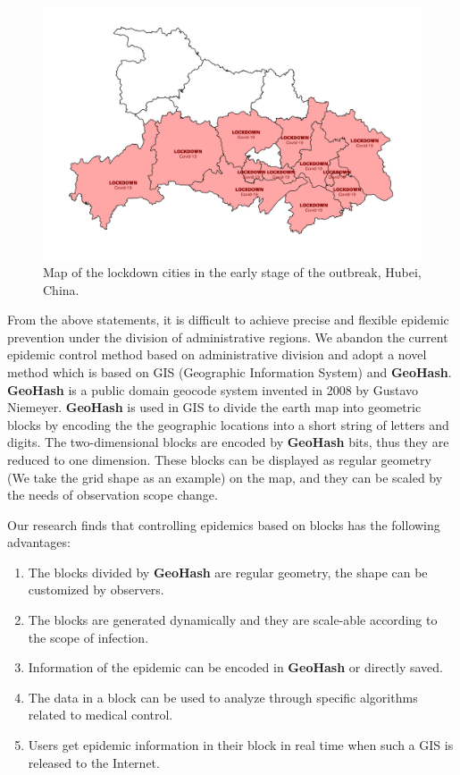 \documentclass[conference]{IEEEtran}
\begin{document}
\begin{figure}[h]
    \centering
    \includegraphics[width=\linewidth]{hubei.png}
    \caption{Map of the lockdown cities in the early stage of the outbreak, Hubei, China.}
\end{figure}

From the above statements, it is difficult to achieve precise and flexible epidemic prevention under the division of administrative regions.
We abandon the current epidemic control method based on administrative division and adopt a novel method which is based on GIS (Geographic Information System)\cite{clarke1986advances} and \textbf{GeoHash}.
\textbf{GeoHash} is a public domain geocode system invented in 2008 by Gustavo Niemeyer\cite{niemeyer2008geohash}.
\textbf{GeoHash} is used in GIS to divide the earth map into geometric blocks by encoding the the geographic locations into a short string of letters and digits.
The two-dimensional blocks are encoded by \textbf{GeoHash} bits, thus they are reduced to one dimension.
These blocks can be displayed as regular geometry (We take the grid shape as an example) on the map, and they can be scaled by the needs of observation scope change.

Our research finds that controlling epidemics based on blocks has the following advantages:
\begin{enumerate}
    \item The blocks divided by \textbf{GeoHash} are regular geometry, the shape can be customized by observers.
    \item The blocks are generated dynamically and they are scale-able according to the scope of infection.
    \item Information of the epidemic can be encoded in \textbf{GeoHash} or directly saved.
    \item The data in a block can be used to analyze through specific algorithms related to medical control.
    \item Users get epidemic information in their block in real time when such a GIS is released to the Internet.
\end{enumerate}
\end{document}
